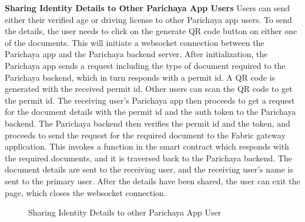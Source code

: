 \textbf{Sharing Identity Details to Other Parichaya App Users} \newline
Users can send either their verified age or driving license to other Parichaya app users. To send the details, the user needs to click on the generate QR code button on either one of the documents. This will initiate a websocket connection between the Parichaya app and the Parichaya backend server. After initialization, the Parichaya app sends a request including the type of document required to the Parichaya backend, which in turn responds with a permit id. A QR code is generated with the received permit id. Other users can scan the QR code to get the permit id. The receiving user’s Parichaya app then proceeds to get a request for the document details with the permit id  and the auth token to the Parichaya backend. The Parichaya backend then verifies the permit id and the token, and proceeds to send the request for the required document to the Fabric gateway application. This invokes a function in the smart contract which responds with the required documents, and it is traversed back to the Parichaya backend. The document details are sent to the receiving user, and the receiving user’s name is sent to the primary user. After the details have been shared, the user can exit the page, which closes the websocket connection.
\begin{figure}[H]
\centerline{}
\caption{Sharing Identity Details to other Parichaya App User}

\label{fig: QRToShareSequence.svg}
\end{figure}






